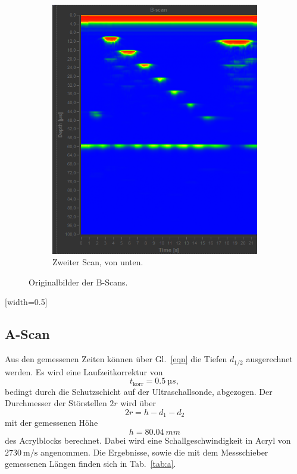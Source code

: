 \begin{figure}
\begin{subfigure}{0.48\textwidth}
    \includegraphics[width=\textwidth]{daten/b/2.png}
    \caption{Zweiter Scan, von unten.}
    \label{fig:db2}
  \end{subfigure}
  \caption{Originalbilder der B-Scans.}
  \label{fig:db}
\end{figure}
[width=0.5\textwidth]
\FloatBarrier

\subsection{A-Scan}
Aus den gemessenen Zeiten können über Gl.~\eqref{eqn} die Tiefen $d_{1/2}$ ausgerechnet werden. Es wird eine Laufzeitkorrektur von
\begin{equation}
  t_\text{korr} = \SI{0.5}{µs},
\end{equation}
bedingt durch die Schutzschicht auf der Ultraschallsonde, abgezogen. Der Durchmesser der Störstellen $2r$ wird über
\begin{equation}
  2r = h - d_1 - d_2
\end{equation} mit der gemessenen Höhe
\begin{equation}
  h = \SI{80.04}{mm}
\end{equation}
des Acrylblocks berechnet. Dabei wird eine Schallgeschwindigkeit in Acryl von $\SI{2730}{\meter\per\second}$ \cite{olympus} angenommen. Die Ergebnisse, sowie die mit dem Messschieber gemessenen Längen finden sich in Tab.~\ref{tab:a}.


